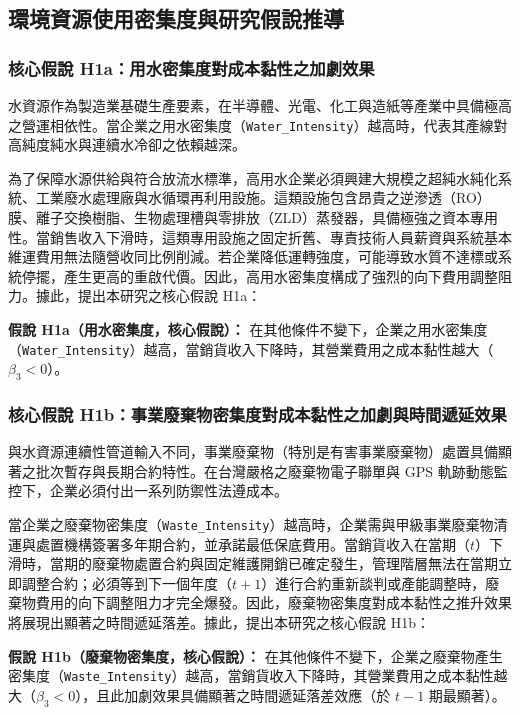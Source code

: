 \documentclass[12pt,a4paper]{article}
\begin{document}
\subsection{環境資源使用密集度與研究假說推導}

\subsubsection{核心假說 H1a：用水密集度對成本黏性之加劇效果}

水資源作為製造業基礎生產要素，在半導體、光電、化工與造紙等產業中具備極高之營運相依性。當企業之用水密集度（\texttt{Water\_Intensity}）越高時，代表其產線對高純度純水與連續水冷卻之依賴越深。

為了保障水源供給與符合放流水標準，高用水企業必須興建大規模之超純水純化系統、工業廢水處理廠與水循環再利用設施。這類設施包含昂貴之逆滲透（RO）膜、離子交換樹脂、生物處理槽與零排放（ZLD）蒸發器，具備極強之資本專用性。當銷售收入下滑時，這類專用設施之固定折舊、專責技術人員薪資與系統基本維運費用無法隨營收同比例削減。若企業降低運轉強度，可能導致水質不達標或系統停擺，產生更高的重啟代價。因此，高用水密集度構成了強烈的向下費用調整阻力。據此，提出本研究之核心假說 H1a：

\textbf{假說 H1a（用水密集度，核心假說）：} 在其他條件不變下，企業之用水密集度（\texttt{Water\_Intensity}）越高，當銷貨收入下降時，其營業費用之成本黏性越大（$\beta_3 < 0$）。

\subsubsection{核心假說 H1b：事業廢棄物密集度對成本黏性之加劇與時間遞延效果}

與水資源連續性管道輸入不同，事業廢棄物（特別是有害事業廢棄物）處置具備顯著之批次暫存與長期合約特性。在台灣嚴格之廢棄物電子聯單與 GPS 軌跡動態監控下，企業必須付出一系列防禦性法遵成本。

當企業之廢棄物密集度（\texttt{Waste\_Intensity}）越高時，企業需與甲級事業廢棄物清運與處置機構簽署多年期合約，並承諾最低保底費用。當銷貨收入在當期（$t$）下滑時，當期的廢棄物處置合約與固定維護開銷已確定發生，管理階層無法在當期立即調整合約；必須等到下一個年度（$t+1$）進行合約重新談判或產能調整時，廢棄物費用的向下調整阻力才完全爆發。因此，廢棄物密集度對成本黏性之推升效果將展現出顯著之時間遞延落差。據此，提出本研究之核心假說 H1b：

\textbf{假說 H1b（廢棄物密集度，核心假說）：} 在其他條件不變下，企業之廢棄物產生密集度（\texttt{Waste\_Intensity}）越高，當銷貨收入下降時，其營業費用之成本黏性越大（$\beta_3 < 0$），且此加劇效果具備顯著之時間遞延落差效應（於 $t-1$ 期最顯著）。
\end{document}
